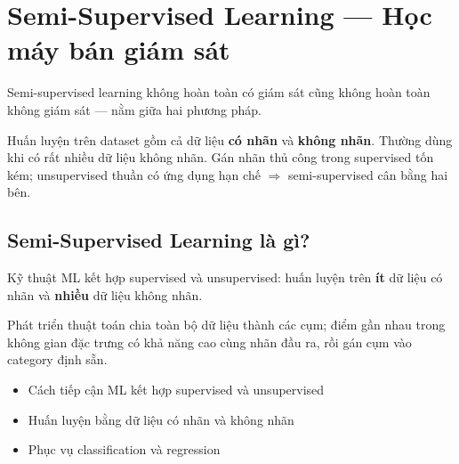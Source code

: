 \section{Semi-Supervised Learning --- Học máy bán giám sát}

\begin{dongco}[title={Giữa supervised và unsupervised}]
Semi-supervised learning không hoàn toàn có giám sát cũng không hoàn toàn không giám sát --- nằm giữa hai phương pháp.
\end{dongco}

\begin{vidu}[title={Minh hoạ semi-supervised}]
\end{vidu}

\begin{ynghia}[title={Bối cảnh sử dụng}]
Huấn luyện trên dataset gồm cả dữ liệu \textbf{có nhãn} và \textbf{không nhãn}.
Thường dùng khi có rất nhiều dữ liệu không nhãn.
Gán nhãn thủ công trong supervised tốn kém; unsupervised thuần có ứng dụng hạn chế $\Rightarrow$ semi-supervised cân bằng hai bên.
\end{ynghia}

\subsection{Semi-Supervised Learning là gì?}

\begin{dinhnghia}[title={Định nghĩa}]
Kỹ thuật ML kết hợp supervised và unsupervised: huấn luyện trên \textbf{ít} dữ liệu có nhãn và \textbf{nhiều} dữ liệu không nhãn.
\end{dinhnghia}

\begin{ynghia}[title={target}]
Phát triển thuật toán chia toàn bộ dữ liệu thành các cụm; điểm gần nhau trong không gian đặc trưng có khả năng cao cùng nhãn đầu ra, rồi gán cụm vào category định sẵn.
\end{ynghia}

\begin{vidu}[title={Tóm tắt}]
\begin{itemize}
  \item Cách tiếp cận ML kết hợp supervised và unsupervised
  \item Huấn luyện bằng dữ liệu có nhãn và không nhãn
  \item Phục vụ classification và regression
\end{itemize}
\end{vidu}

